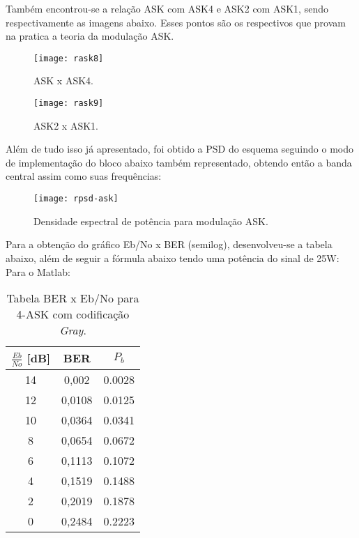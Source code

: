 Também encontrou-se a relação ASK com ASK4 e ASK2 com ASK1, sendo respectivamente as imagens abaixo. Esses pontos são os respectivos que provam na pratica a teoria da modulação ASK.

\begin{figure}[H]
    \centering
    \texttt{[image: rask8]}
    \caption{ASK x ASK4.}
    \label{fig:rask8}
\end{figure}

\begin{figure}[H]
    \centering
    \texttt{[image: rask9]}
    \caption{ASK2 x ASK1.}
    \label{fig:rask9}
\end{figure}

Além de tudo isso já apresentado, foi obtido a PSD do esquema seguindo o modo de implementação do bloco abaixo também representado, obtendo então a banda central assim como suas frequências:

\begin{figure}[H]
    \centering
    \texttt{[image: rpsd-ask]}
    \caption{Densidade espectral de potência para modulação ASK.}
    \label{fig:rpsdask}
\end{figure}

Para a obtenção do gráfico Eb/No x BER (semilog), desenvolveu-se a tabela abaixo, além de seguir a fórmula abaixo tendo uma potência do sinal de 25W:
Para o Matlab:

\begin{small}
    \begin{table}[H]
        \begin{center}
            \caption{Tabela BER x Eb/No para 4-ASK com codificação \textit{Gray}.}
            \begin{tabular}{c|c|c}
                \hline
                $\frac{Eb}{No}$ [dB] & BER & $P_b$ \\
                \hline
                14 & 0,002 & 0.0028\\
                \hline
                12 & 0,0108 & 0.0125\\
                \hline
                10 & 0,0364 & 0.0341\\
                \hline
                8 & 0,0654 & 0.0672\\
                \hline
                6 & 0,1113 & 0.1072 \\
                \hline
                4 & 0,1519 & 0.1488 \\
                \hline
                2 & 0,2019 & 0.1878 \\
                \hline
                0 & 0,2484 & 0.2223 \\
                \hline
            \end{tabular}
            \label{tab:3}
        \end{center}
    \end{table}
\end{small}

